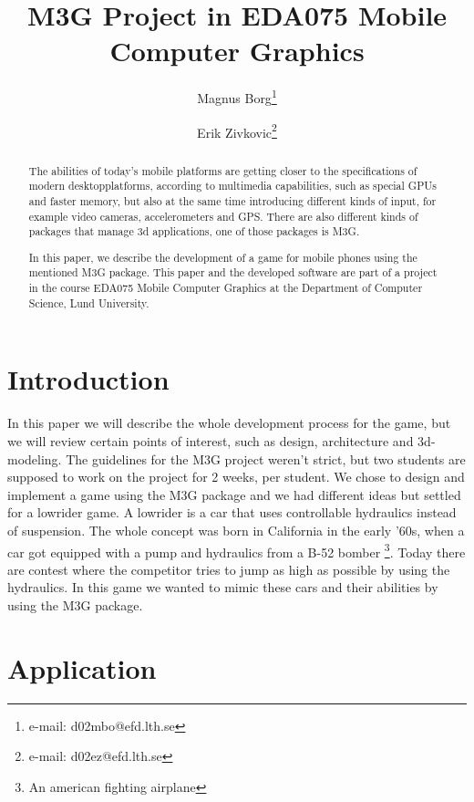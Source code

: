 \documentclass{acmsiggraph}               %
\title{M3G Project in EDA075 Mobile Computer Graphics}
\author{Magnus Borg\thanks{e-mail: d02mbo@efd.lth.se} \and Erik Zivkovic\thanks{e-mail: d02ez@efd.lth.se}
}
\affiliation{Lund University\\ Sweden}
\newif\ifpdf
\begin{document}
\ifpdf
  \DeclareGraphicsExtensions{.jpg,.pdf,.mps,.png}
\else
\fi


\maketitle

\begin{abstract}
The abilities of today's mobile platforms are getting closer to the specifications
of modern desktopplatforms, according to multimedia capabilities, such as special
GPUs and faster memory, but also at the same time introducing different kinds of 
input, for example video cameras, accelerometers and GPS. There are also different 
kinds of packages that manage 3d applications, one of those packages is M3G.

In this paper, we describe the development of a game for mobile phones
using the mentioned M3G package. This paper and the developed software are part 
of a project in the course EDA075 Mobile Computer Graphics at
the Department of Computer Science, Lund University. 
\end{abstract}


\section{Introduction}
In this paper we will describe the whole development process for the game, but we
will review certain points of interest, such as design, architecture and 3d-modeling.
The guidelines for the M3G project weren't strict, but two students are supposed to
work on the project for 2 weeks, per student. 
We chose to design and implement a game using the M3G package and we had different 
ideas but settled for a lowrider game. A lowrider is a car that uses controllable 
hydraulics instead of suspension. The whole concept was born in California in the 
early '60s, when a car got equipped with a pump and hydraulics from a B-52 bomber
\footnote{An american fighting airplane}.
Today there are contest where the competitor tries to jump as high as possible by
using the hydraulics. 
In this game we wanted to mimic these cars and their abilities by using the M3G 
package.  


\section{Application}
\end{document}
